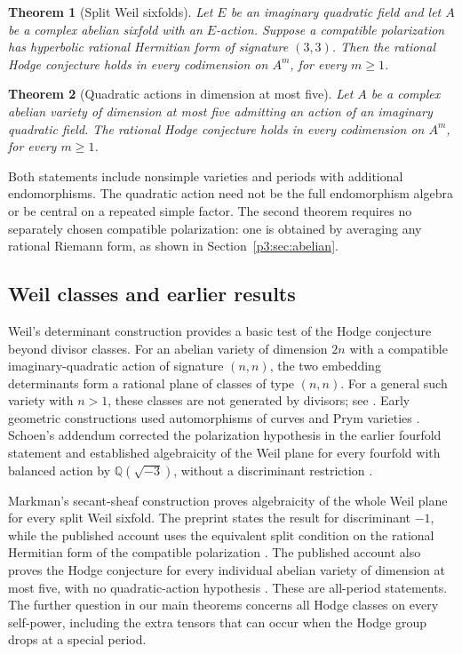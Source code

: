 \documentclass[11pt]{article}
\newcommand{\Q}{\mathbb Q}
\newtheorem{theorem}{Theorem}[section]
\numberwithin{equation}{section}
\begin{document}
\begin{theorem}[Split Weil sixfolds]
\label{p3ab:split-sixfolds}
Let \(E\) be an imaginary quadratic field and let \(A\) be a complex
abelian sixfold with an \(E\)-action.  Suppose a compatible
polarization has hyperbolic rational Hermitian form of signature
\((3,3)\).  Then the rational Hodge conjecture holds in every
codimension on \(A^m\), for every \(m\geq1\).
\end{theorem}

\begin{theorem}[Quadratic actions in dimension at most five]
\label{p3ab:quadratic-five}
Let \(A\) be a complex abelian variety of dimension at most five
admitting an action of an imaginary quadratic field.  The rational
Hodge conjecture holds in every codimension on \(A^m\), for every
\(m\geq1\).
\end{theorem}

Both statements include nonsimple varieties and periods with additional
endomorphisms. The quadratic action need not be the full endomorphism
algebra or be central on a repeated simple factor. The second theorem
requires no separately chosen compatible polarization: one is obtained by
averaging any rational Riemann form, as shown in
Section~\ref{p3:sec:abelian}.

\subsection{Weil classes and earlier results}

Weil's determinant construction \cite{Weil1979} provides a basic test of the Hodge
conjecture beyond divisor classes. For an abelian variety of dimension
\(2n\) with a compatible imaginary-quadratic action of signature
\((n,n)\), the two embedding determinants form a rational plane of
classes of type \((n,n)\). For a general such variety with \(n>1\),
these classes are not generated by divisors; see
\cite[Sections~4.9--4.11]{vanGeemenWeilNotes}.
Early geometric constructions used automorphisms of curves and Prym
varieties \cite{Schoen1988}. Schoen's addendum corrected the polarization
hypothesis in the earlier fourfold statement and established algebraicity
of the Weil plane for every fourfold with balanced action by
\(\Q(\sqrt{-3})\), without a discriminant restriction
\cite{Schoen1998Addendum}.

Markman's secant-sheaf construction proves algebraicity of the whole Weil
plane for every split Weil sixfold. The preprint states the result for
discriminant \(-1\), while the published account uses the equivalent
split condition on the rational Hermitian form of the compatible
polarization \cite[Theorem~1.5.1]{Markman2025Secant}
\cite[Theorem~1.2]{Markman2026ICM}.
The published account also proves the Hodge conjecture for every
individual abelian variety of dimension at most five, with no
quadratic-action hypothesis \cite[Corollary~1.3]{Markman2026ICM}.
These are all-period statements. The further question in our main
theorems concerns all Hodge classes on every self-power, including the
extra tensors that can occur when the Hodge group drops at a special
period.
\end{document}
